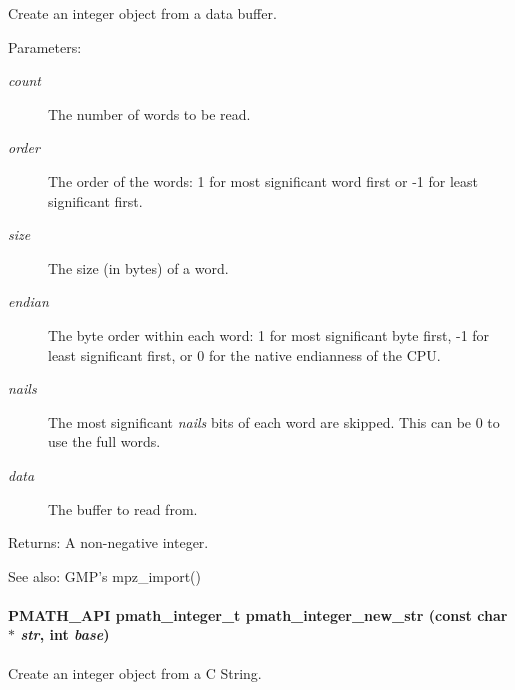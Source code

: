 Create an integer object from a data buffer. 

\begin{Desc}
\item[Parameters:]
\begin{description}
\item[{\em count}]The number of words to be read. \item[{\em order}]The order of the words: 1 for most significant word first or -1 for least significant first. \item[{\em size}]The size (in bytes) of a word. \item[{\em endian}]The byte order within each word: 1 for most significant byte first, -1 for least significant first, or 0 for the native endianness of the CPU. \item[{\em nails}]The most significant {\em nails\/} bits of each word are skipped. This can be 0 to use the full words. \item[{\em data}]The buffer to read from. \end{description}
\end{Desc}
\begin{Desc}
\item[Returns:]A non-negative integer.\end{Desc}
\begin{Desc}
\item[See also:]GMP's mpz\_\-import() \end{Desc}
\hypertarget{group__numbers_gaca3cb69b051e8f361784f2dc3836fcf}{
\paragraph[{pmath\_\-integer\_\-new\_\-str}]{\setlength{\rightskip}{0pt plus 5cm}PMATH\_\-API {\bf pmath\_\-integer\_\-t} pmath\_\-integer\_\-new\_\-str (const char $\ast$ {\em str}, \/  int {\em base})}\hfill}
\label{group__numbers_gaca3cb69b051e8f361784f2dc3836fcf}


Create an integer object from a C String. 


